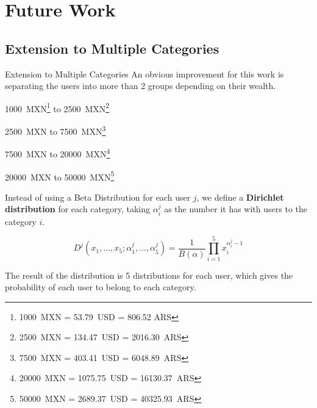 \documentclass{beamer}
\newcommand{\Beta}{B}
\begin{document}
\section{Future Work}
\subsection{Extension to Multiple Categories}

\begin{frame}{Extension to Multiple Categories}
	An obvious improvement for this work is separating the users into more than 2 groups depending on their wealth.

	\begin{description}[leftmargin=!]
		\item[\(R_1\)] \num{1000}~MXN\footnote{\num{1000}~MXN = \num{53.79}~USD = \num{806.52} ARS} to \num{2500}~MXN\footnote{\num{2500}~MXN = \num{134.47}~USD = \num{2016.30}~ARS}
		\item[\(R_2\)] \num{2500}~MXN to \num{7500}~MXN\footnote{\num{7500}~MXN = \num{403.41}~USD = \num{6048.89}~ARS}
		\item[\(R_3\)] \num{7500}~MXN to \num{20000}~MXN\footnote{\num{20000}~MXN = \num{1075.75}~USD = \num{16130.37}~ARS}
		\item[\(R_4\)] \num{20000}~MXN to \num{50000}~MXN\footnote{\num{50000}~MXN = \num{2689.37}~USD = \num{40325.93}~ARS}
	\end{description}
\end{frame}

\begin{frame}
	Instead of using a Beta Distribution for each user \( j \), we define a \textbf{Dirichlet distribution} for each category, taking \( \alpha^j_i \) as the number it has with users to the category \( i \).

	\[
		D^j \left( x_1, \ldots, x_5; \alpha^j_1, \ldots, \alpha^j_5 \right) = \frac{1}{\Beta(\alpha)} \prod^5_{i = 1}{x_i^{\alpha^j_i - 1}}
	\]

	\pause{}

	The result of the distribution is 5 distributions for each user, which gives the probability of each user to belong to each category.
\end{frame}
\end{document}
